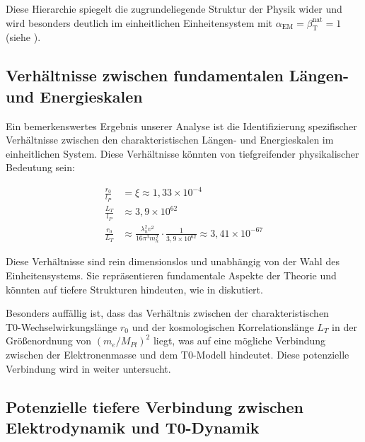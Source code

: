 \documentclass[12pt,a4paper]{article}
\newcommand{\alphaEM}{\alpha_{\text{EM}}}
\newcommand{\betaT}{\beta_{\text{T}}}
\begin{document}
	Diese Hierarchie spiegelt die zugrundeliegende Struktur der Physik wider und wird besonders deutlich im einheitlichen Einheitensystem mit \(\alphaEM = \betaT^{\text{nat}} = 1\) (siehe \cite{pascher_temp_2025}).
	
	\subsection{Verhältnisse zwischen fundamentalen Längen- und Energieskalen}
	\label{subsec:ratios}
	
	Ein bemerkenswertes Ergebnis unserer Analyse ist die Identifizierung spezifischer Verhältnisse zwischen den charakteristischen Längen- und Energieskalen im einheitlichen System. Diese Verhältnisse könnten von tiefgreifender physikalischer Bedeutung sein:
	
	\begin{tcolorbox}[colback=blue!5!white,colframe=blue!75!black,title=Fundamentale Verhältnisse im einheitlichen Einheitensystem]
		\begin{align}
			\frac{r_0}{l_P} &= \xi \approx 1,33 \times 10^{-4} \\
			\frac{L_T}{l_P} &\approx 3,9 \times 10^{62} \\
			\frac{r_0}{L_T} &\approx \frac{\lambda_h^2 v^2}{16\pi^3 m_h^2} \cdot \frac{1}{3,9 \times 10^{62}} \approx 3,41 \times 10^{-67}
		\end{align}
	\end{tcolorbox}
	
	Diese Verhältnisse sind rein dimensionslos und unabhängig von der Wahl des Einheitensystems. Sie repräsentieren fundamentale Aspekte der Theorie und könnten auf tiefere Strukturen hindeuten, wie in \cite{pascher_planck_2025} diskutiert.
	
	Besonders auffällig ist, dass das Verhältnis zwischen der charakteristischen \\T0-Wechselwirkungslänge \(r_0\) und der kosmologischen Korrelationslänge \(L_T\) in der Größenordnung von \((m_e/M_{Pl})^2\) liegt, was auf eine mögliche Verbindung zwischen der Elektronenmasse und dem T0-Modell hindeutet. Diese potenzielle Verbindung wird in \cite{pascher_galaxies_2025} weiter untersucht.
	
	\subsection{Potenzielle tiefere Verbindung zwischen Elektrodynamik und T0-Dynamik}
	\label{subsec:deeper_connection}
	
\end{document}
